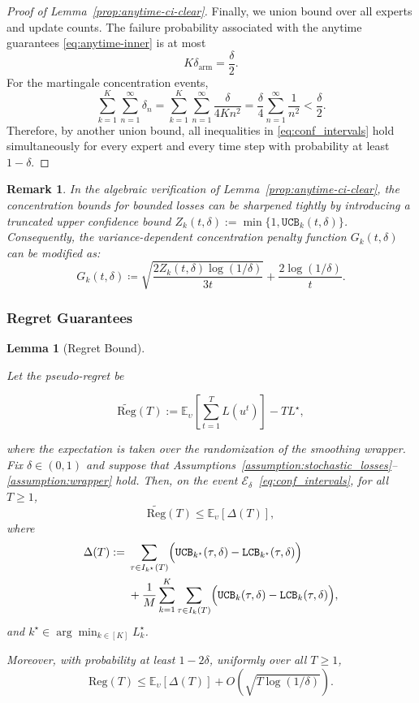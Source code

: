 \documentclass[a4paper,14pt]{extarticle}
\theoremstyle{plain}
\newtheorem{remark}{Remark}
\newtheorem{lemma}{Lemma}
\newcommand{\LCB}{\texttt{LCB}}
\newcommand{\UCB}{\texttt{UCB}}
\begin{document}
\begin{proof}[Proof of Lemma~\ref{prop:anytime-ci-clear}]
Finally, we union bound over all experts and update counts.
The failure probability associated with the anytime guarantees
\eqref{eq:anytime-inner} is at most
\[
K\delta_{\mathrm{arm}}
=
\frac{\delta}{2}.
\]
For the martingale concentration events,
\begin{equation}
\sum_{k=1}^{K}\sum_{n=1}^{\infty}\delta_n
=
\sum_{k=1}^{K}\sum_{n=1}^{\infty}
\frac{\delta}{4Kn^2}
=
\frac{\delta}{4}
\sum_{n=1}^{\infty}\frac1{n^2}
<
\frac{\delta}{2}.
\end{equation}
Therefore, by another union bound, all inequalities in
\eqref{eq:conf_intervals} hold simultaneously for every expert and every
time step with probability at least $1-\delta$.

\end{proof}

\begin{remark}
In the algebraic verification of Lemma~\ref{prop:anytime-ci-clear}, the concentration bounds for bounded losses can be sharpened tightly by introducing a truncated upper confidence bound $Z_k(t, \delta) := \min\{1, \UCB_k(t, \delta)\}$. Consequently, the variance-dependent concentration penalty function $G_k(t, \delta)$ can be modified as:
\[
G_k(t, \delta) \coloneqq \sqrt{\frac{2 Z_k(t, \delta) \log(1/\delta)}{3t}} + \frac{2 \log(1/\delta)}{t}.
\]
\end{remark}

\subsubsection{Regret Guarantees}
\label{sec:regret_guarantees_one}
\begin{lemma}[Regret Bound]
\label{lem:regret_bounds}

Let the pseudo-regret be

\begin{equation}
\widetilde{\mathrm{Reg}}(T) := \mathbb E_{\upsilon} \!\left[ \sum_{t=1}^{T} L(u^t) \right] - T L^\star ,
\end{equation}

where the expectation is taken over the randomization of the smoothing wrapper. Fix $\delta\in(0,1)$ and suppose that Assumptions~\ref{assumption:stochastic_losses}-- \ref{assumption:wrapper} hold. Then, on the event $\mathcal E_\delta$~\eqref{eq:conf_intervals}, for all $T\ge1$,
\[
\widetilde{\mathrm{Reg}}(T) \le \mathbb E_\upsilon[\Delta(T)],
\]
where
\begin{align}
\label{eq:bound_bound_bound}
\Delta(T) := {}& \sum_{\tau\in I_{k^\star}(T)} \Bigl( \UCB_{k^\star}(\tau,\delta) - \LCB_{k^\star}(\tau,\delta) \Bigr) \\
 & + \frac1M \sum_{k=1}^{K} \sum_{\tau\in I_k(T)} \Bigl( \UCB_k(\tau,\delta) - \LCB_k(\tau,\delta) \Bigr),
\end{align}
and
$k^\star \in \arg\min_{k\in[K]} L_k^\star$.


Moreover, with probability at least $1-2\delta$, uniformly over all
$T\ge1$, \[ \mathrm{Reg}(T) \le \mathbb E_\upsilon[\Delta(T)] + O\!\left( \sqrt{T\log(1/\delta)} \right).
\]

\end{lemma}
\end{document}

